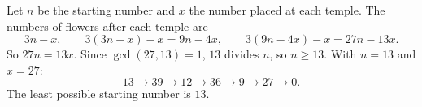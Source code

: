 Let $n$ be the starting number and $x$ the number placed at each temple. The numbers of flowers after each temple are
\[3n-x,\qquad3(3n-x)-x=9n-4x,\qquad 3(9n-4x)-x=27n-13x .\]
So $27n=13x$. Since $\gcd(27,13)=1$, $13$ divides $n$, so $n\ge13$. With $n=13$ and $x=27$:
\[13\to39\to12\to36\to9\to27\to0 .\]
The least possible starting number is $\boxed{13}$.

